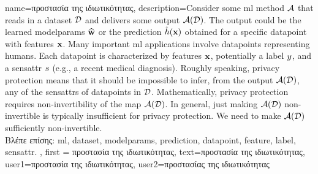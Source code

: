 
{name={\foreignlanguage{greek}{προστασία της ιδιωτικότητας}},
     description={Consider some \gls{ml} method $\mathcal{A}$ that reads 
	 in a \gls{dataset} $\mathcal{D}$ and delivers some output $\mathcal{A}(\mathcal{D})$. The output 
	 could be the learned \gls{modelparams} $\widehat{{\bf w}}$ or the \gls{prediction} 
	 $\hat{h}({\bf x})$ obtained for a specific \gls{datapoint} with \gls{feature}s 
	 ${\bf x}$. Many important \gls{ml} applications involve \gls{datapoint}s 
		representing humans. Each \gls{datapoint} is characterized by \gls{feature}s ${\bf x}$, 
		potentially a \gls{label} $y$, and a \gls{sensattr} $s$ (e.g., a recent medical diagnosis). 
		Roughly speaking, privacy protection means that it should be impossible to infer, from the output $\mathcal{A}(\mathcal{D})$, 
		any of the \gls{sensattr}s of \gls{datapoint}s in $\mathcal{D}$. Mathematically, privacy protection requires non-invertibility 
		of the map $\mathcal{A}(\mathcal{D})$. In general, just making $\mathcal{A}(\mathcal{D})$ non-invertible 
		is typically insufficient for privacy protection. We need to make $\mathcal{A}(\mathcal{D})$ sufficiently non-invertible.\\
		\foreignlanguage{greek}{Βλέπε επίσης:} \gls{ml}, \gls{dataset}, \gls{modelparams}, \gls{prediction}, \gls{datapoint}, \gls{feature}, \gls{label}, \gls{sensattr}.
	}, 
	first = {\foreignlanguage{greek}{προστασία της ιδιωτικότητας}}, 
	text={\foreignlanguage{greek}{προστασία της ιδιωτικότητας}},
	user1={\foreignlanguage{greek}{προστασία της ιδιωτικότητας}}, %
   	user2={\foreignlanguage{greek}{προστασίας της ιδιωτικότητας}} %
}

